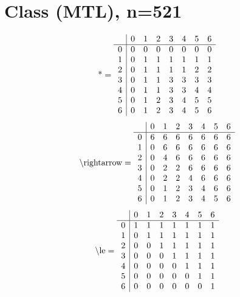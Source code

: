 \documentclass[11pt]{article}
\begin{document}
\section{Class (MTL), n=521}
\[\text{*} = 
\begin{array}{r | r r r r r r r}
 & 0 & 1 & 2 & 3 & 4 & 5 & 6 \\ \hline
0 & 0 & 0 & 0 & 0 & 0 & 0 & 0 \\
1 & 0 & 1 & 1 & 1 & 1 & 1 & 1 \\
2 & 0 & 1 & 1 & 1 & 1 & 2 & 2 \\
3 & 0 & 1 & 1 & 3 & 3 & 3 & 3 \\
4 & 0 & 1 & 1 & 3 & 3 & 4 & 4 \\
5 & 0 & 1 & 2 & 3 & 4 & 5 & 5 \\
6 & 0 & 1 & 2 & 3 & 4 & 5 & 6 \\
\end{array}
\]
\[\text{\textbackslash rightarrow} = 
\begin{array}{r | r r r r r r r}
 & 0 & 1 & 2 & 3 & 4 & 5 & 6 \\ \hline
0 & 6 & 6 & 6 & 6 & 6 & 6 & 6 \\
1 & 0 & 6 & 6 & 6 & 6 & 6 & 6 \\
2 & 0 & 4 & 6 & 6 & 6 & 6 & 6 \\
3 & 0 & 2 & 2 & 6 & 6 & 6 & 6 \\
4 & 0 & 2 & 2 & 4 & 6 & 6 & 6 \\
5 & 0 & 1 & 2 & 3 & 4 & 6 & 6 \\
6 & 0 & 1 & 2 & 3 & 4 & 5 & 6 \\
\end{array}
\]
\[\text{\textbackslash le} = 
\begin{array}{r | r r r r r r r}
 & 0 & 1 & 2 & 3 & 4 & 5 & 6 \\ \hline
0 & 1 & 1 & 1 & 1 & 1 & 1 & 1 \\
1 & 0 & 1 & 1 & 1 & 1 & 1 & 1 \\
2 & 0 & 0 & 1 & 1 & 1 & 1 & 1 \\
3 & 0 & 0 & 0 & 1 & 1 & 1 & 1 \\
4 & 0 & 0 & 0 & 0 & 1 & 1 & 1 \\
5 & 0 & 0 & 0 & 0 & 0 & 1 & 1 \\
6 & 0 & 0 & 0 & 0 & 0 & 0 & 1 \\
\end{array}
\]
\end{document}
